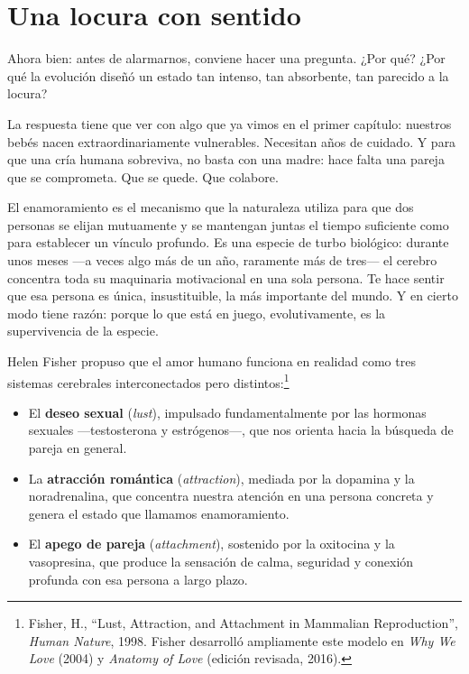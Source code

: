 \section{Una locura con sentido}

Ahora bien: antes de alarmarnos, conviene hacer una pregunta. ¿Por qué? ¿Por qué la evolución diseñó un estado tan intenso, tan absorbente, tan parecido a la locura?

La respuesta tiene que ver con algo que ya vimos en el primer capítulo: nuestros bebés nacen extraordinariamente vulnerables. Necesitan años de cuidado. Y para que una cría humana sobreviva, no basta con una madre: hace falta una pareja que se comprometa. Que se quede. Que colabore.

El enamoramiento es el mecanismo que la naturaleza utiliza para que dos personas se elijan mutuamente y se mantengan juntas el tiempo suficiente como para establecer un vínculo profundo. Es una especie de turbo biológico: durante unos meses ---a veces algo más de un año, raramente más de tres--- el cerebro concentra toda su maquinaria motivacional en una sola persona. Te hace sentir que esa persona es única, insustituible, la más importante del mundo. Y en cierto modo tiene razón: porque lo que está en juego, evolutivamente, es la supervivencia de la especie.

Helen Fisher propuso que el amor humano funciona en realidad como tres sistemas cerebrales interconectados pero distintos:\footnote{Fisher, H., ``Lust, Attraction, and Attachment in Mammalian Reproduction'', \textit{Human Nature}, 1998. Fisher desarrolló ampliamente este modelo en \textit{Why We Love} (2004) y \textit{Anatomy of Love} (edición revisada, 2016).}

\begin{itemize}
    \item El \textbf{deseo sexual} (\textit{lust}), impulsado fundamentalmente por las hormonas sexuales ---testosterona y estrógenos---, que nos orienta hacia la búsqueda de pareja en general.
    \item La \textbf{atracción romántica} (\textit{attraction}), mediada por la dopamina y la noradrenalina, que concentra nuestra atención en una persona concreta y genera el estado que llamamos enamoramiento.
    \item El \textbf{apego de pareja} (\textit{attachment}), sostenido por la oxitocina y la vasopresina, que produce la sensación de calma, seguridad y conexión profunda con esa persona a largo plazo.
\end{itemize}

